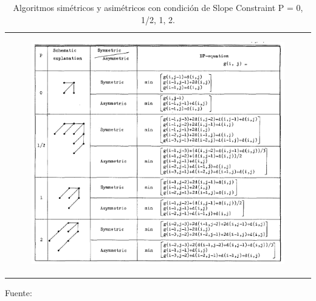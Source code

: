 \begin{enumerate}
\begin{enumerate}
\begin{center}
\begin{table}[h!]
\centering
\vskip -0.2cm
\caption{\small{Algoritmos simétricos y asimétricos con condición de Slope Constraint P = 0, 1/2, 1, 2.}}
\label{table:tabla2}
\begin{tabular}{c}
\begin{minipage}{.9\textwidth}
\begin{center}
\includegraphics[width=0.85\textwidth]{Imagenes/Cap2/image057}
\end{center}
\end{minipage}
\end{tabular}
\begin{center}
\vskip 0.2cm
{\small{Fuente: \cite{sakoe}}}
\end{center}
\end{table}
\end{center}

\end{enumerate}


\end{enumerate}
